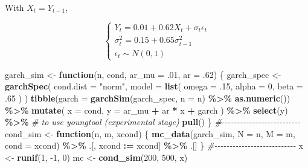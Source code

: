 \documentclass[
]{article}
\newenvironment{Shaded}{\begin{snugshade}}{\end{snugshade}}
\newcommand{\CommentTok}[1]{\textcolor[rgb]{0.56,0.35,0.01}{\textit{#1}}}
\newcommand{\ControlFlowTok}[1]{\textcolor[rgb]{0.13,0.29,0.53}{\textbf{#1}}}
\newcommand{\DataTypeTok}[1]{\textcolor[rgb]{0.13,0.29,0.53}{#1}}
\newcommand{\DecValTok}[1]{\textcolor[rgb]{0.00,0.00,0.81}{#1}}
\newcommand{\ErrorTok}[1]{\textcolor[rgb]{0.64,0.00,0.00}{\textbf{#1}}}
\newcommand{\FloatTok}[1]{\textcolor[rgb]{0.00,0.00,0.81}{#1}}
\newcommand{\KeywordTok}[1]{\textcolor[rgb]{0.13,0.29,0.53}{\textbf{#1}}}
\newcommand{\NormalTok}[1]{#1}
\newcommand{\OperatorTok}[1]{\textcolor[rgb]{0.81,0.36,0.00}{\textbf{#1}}}
\newcommand{\StringTok}[1]{\textcolor[rgb]{0.31,0.60,0.02}{#1}}
\theoremstyle{definition}
\theoremstyle{definition}
\theoremstyle{definition}
\theoremstyle{remark}
\let\BeginKnitrBlock\begin \let\EndKnitrBlock\end
\begin{document}
\BeginKnitrBlock{example}[AR(1)-GARCH(0,1) Model]
\protect\hypertarget{exm:garch}{}{\label{exm:garch} {} }With \(X_t = Y_{t - 1}\),

\[
\begin{cases}
  Y_t = 0.01 + 0.62 X_t + \sigma_t \epsilon_t \\
  \sigma_t^2 = 0.15 + 0.65 \sigma_{t - 1}^2 \\
  \epsilon_t \sim N(0, 1)
\end{cases}
\]
\EndKnitrBlock{example}

\begin{Shaded}
\begin{Highlighting}[]
\NormalTok{garch\_sim <{-}}\StringTok{ }\ControlFlowTok{function}\NormalTok{(n, cond, }\DataTypeTok{ar\_mu =} \FloatTok{.01}\NormalTok{, }\DataTypeTok{ar =} \FloatTok{.62}\NormalTok{) \{}
\NormalTok{  garch\_spec <{-}}\StringTok{ }
\StringTok{    }\KeywordTok{garchSpec}\NormalTok{(}
      \DataTypeTok{cond.dist =} \StringTok{"norm"}\NormalTok{,}
      \DataTypeTok{model =} \KeywordTok{list}\NormalTok{(}
        \DataTypeTok{omega =} \FloatTok{.15}\NormalTok{, }\DataTypeTok{alpha =} \DecValTok{0}\NormalTok{, }\DataTypeTok{beta =} \FloatTok{.65}
\NormalTok{      )}
\NormalTok{    )}
  \KeywordTok{tibble}\NormalTok{(}\DataTypeTok{garch =} \KeywordTok{garchSim}\NormalTok{(garch\_spec, }\DataTypeTok{n =}\NormalTok{ n) }\OperatorTok{\%>\%}\StringTok{ }\KeywordTok{as.numeric}\NormalTok{()) }\OperatorTok{\%>\%}\StringTok{ }
\StringTok{    }\KeywordTok{mutate}\NormalTok{(}
      \DataTypeTok{x =}\NormalTok{ cond,}
      \DataTypeTok{y =}\NormalTok{ ar\_mu }\OperatorTok{+}\StringTok{ }\NormalTok{ar }\OperatorTok{*}\StringTok{ }\NormalTok{x }\OperatorTok{+}\StringTok{ }\NormalTok{garch}
\NormalTok{    ) }\OperatorTok{\%>\%}\StringTok{ }
\StringTok{    }\KeywordTok{select}\NormalTok{(y) }\OperatorTok{\%>\%}\StringTok{ }\CommentTok{\# to use youngtool (experimental stage)}
\StringTok{    }\KeywordTok{pull}\NormalTok{()}
\NormalTok{\}}
\CommentTok{\#{-}{-}{-}{-}{-}{-}{-}{-}{-}{-}{-}{-}{-}{-}{-}{-}{-}{-}{-}{-}{-}{-}{-}{-}{-}{-}}
\NormalTok{cond\_sim <{-}}\StringTok{ }\ControlFlowTok{function}\NormalTok{(n, m, xcond) \{}
  \KeywordTok{mc\_data}\NormalTok{(garch\_sim, }\DataTypeTok{N =}\NormalTok{ n, }\DataTypeTok{M =}\NormalTok{ m, }\DataTypeTok{cond =}\NormalTok{ xcond) }\OperatorTok{\%>\%}\StringTok{ }
\StringTok{    }\NormalTok{.[,}
\NormalTok{      xcond }\OperatorTok{:}\ErrorTok{=}\StringTok{ }\NormalTok{xcond] }\OperatorTok{\%>\%}\StringTok{ }
\StringTok{    }\NormalTok{.[]}
\NormalTok{\}}
\CommentTok{\#{-}{-}{-}{-}{-}{-}{-}{-}{-}{-}{-}{-}{-}{-}{-}{-}{-}{-}{-}{-}{-}{-}{-}{-}{-}{-}{-}}
\NormalTok{x <{-}}\StringTok{ }\KeywordTok{runif}\NormalTok{(}\DecValTok{1}\NormalTok{, }\DecValTok{{-}1}\NormalTok{, }\DecValTok{0}\NormalTok{)}
\NormalTok{mc <{-}}\StringTok{ }\KeywordTok{cond\_sim}\NormalTok{(}\DecValTok{200}\NormalTok{, }\DecValTok{500}\NormalTok{, x)}
\end{Highlighting}
\end{Shaded}
\end{document}
